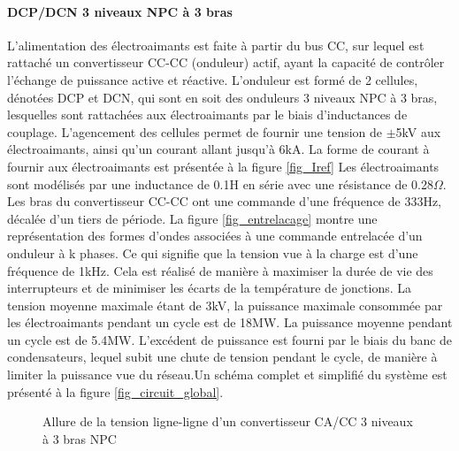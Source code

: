 \paragraph{DCP/DCN 3 niveaux NPC à 3 bras}L'alimentation des électroaimants est faite à partir du bus CC, sur lequel est rattaché un convertisseur CC-CC (onduleur) actif, ayant la capacité de contrôler l'échange de puissance active et réactive. L'onduleur est formé de 2 cellules, dénotées DCP et DCN, qui sont en soit des onduleurs 3 niveaux NPC à 3 bras, lesquelles sont rattachées aux électroaimants par le biais d'inductances de couplage. L'agencement des cellules permet de fournir une tension de $\pm$5kV aux électroaimants, ainsi qu'un courant allant jusqu'à 6kA. La forme de courant à fournir aux électroaimants est présentée à la figure \ref{fig_Iref} Les électroaimants sont modélisés par une inductance de 0.1H en série avec une résistance de 0.28$\Omega$. Les bras du convertisseur CC-CC ont une commande d'une fréquence de 333Hz, décalée d'un tiers de période. La figure \ref{fig_entrelacage} montre une représentation des formes d'ondes associées à une commande entrelacée d'un onduleur à k phases. Ce qui signifie que la tension vue à la charge est d'une fréquence de 1kHz. Cela est réalisé de manière à maximiser la durée de vie des interrupteurs et de minimiser les écarts de la température de jonctions. La tension moyenne maximale étant de 3kV, la puissance maximale consommée par les électroaimants pendant un cycle est de 18MW. La puissance moyenne pendant un cycle est de 5.4MW. L'excédent de puissance est fourni par le biais du banc de condensateurs, lequel subit une chute de tension pendant le cycle, de manière à limiter la puissance vue du réseau.Un schéma complet et simplifié du système est présenté à la figure \ref{fig_circuit_global}.

\begin{figure}[htb]
\centering
{}
\caption{Allure de la tension ligne-ligne d'un convertisseur CA/CC 3 niveaux à 3 bras NPC}
\label{fig_3L_Line_Voltage}
\end{figure}

